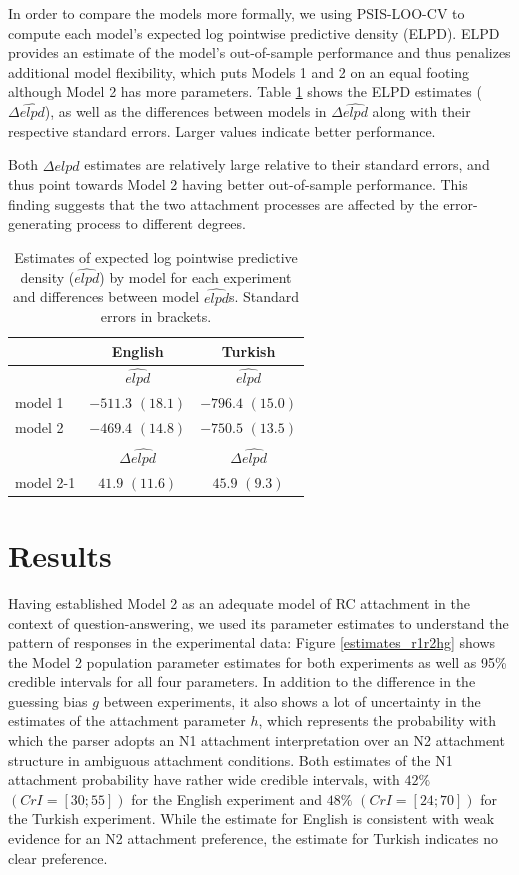 \documentclass[11pt]{article}\usepackage[]{graphicx}\usepackage[]{color}
\begin{document}
In order to compare the models more formally, we using PSIS-LOO-CV \citep{loo} to compute
each model's expected log pointwise predictive density (ELPD). ELPD provides an estimate of the model's out-of-sample performance and thus penalizes additional model flexibility, which puts Models 1 and 2 on an equal footing although Model 2 has more parameters.
Table \ref{tab:model_comp} shows the ELPD estimates ($\Delta\widehat{elpd}$), as well as the differences between models in $\Delta\widehat{elpd}$ along with their respective standard errors. Larger values indicate better performance.

Both $\Delta\widehat{elpd}$ estimates are relatively large relative to their standard errors, and thus point towards Model 2 having better out-of-sample performance.
This finding suggests that the two attachment processes are affected by the error-generating process to different degrees.



\begin{table}
\centering
\begin{tabular}{lcc}
        & English & Turkish \\
\hline
        & $\widehat{elpd}$ & $\widehat{elpd}$ \\
\hline
model 1 & $-511.3$ $(18.1)$ & $-796.4$ $(15.0)$ \\
model 2 & $-469.4$ $(14.8)$ & $-750.5$ $(13.5)$ \\
\hline
 &  &  \\
 & $\Delta\widehat{elpd}$ & $\Delta\widehat{elpd}$ \\
\hline
model 2-1 & $41.9$ $(11.6)$ & $45.9$ $(9.3)$
\end{tabular}
\caption{Estimates of expected log pointwise predictive density ($\widehat{elpd}$) by model for each experiment and differences between model $\widehat{elpd}$s. Standard errors in brackets. }
\label{tab:model_comp}
\end{table}



\section{Results}

Having established Model 2 as an adequate model of RC attachment in the context of question-answering, we used its parameter estimates to understand the pattern of responses in the experimental data: Figure \ref{estimates_r1r2hg} shows the Model 2 population parameter estimates for both experiments as well as 95\% credible intervals for all four parameters. In addition to the difference in the guessing bias $g$ between experiments, it also shows a lot of uncertainty in the estimates of the attachment parameter $h$, which represents the probability with which the parser adopts an N1 attachment interpretation over an N2 attachment structure in ambiguous attachment conditions. 
Both estimates of the N1 attachment probability have rather wide credible intervals, with $42\%$ $(CrI=[30; 55])$ for the English experiment and $48\%$ $(CrI=[24; 70])$ for the Turkish experiment. While the estimate for English is consistent with weak evidence for an N2 attachment preference, the estimate for Turkish indicates no clear preference.
\end{document}
